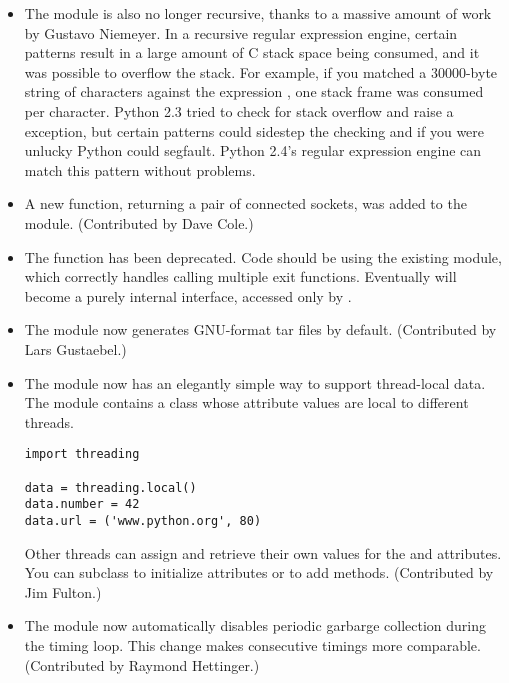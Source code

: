 \documentclass{howto}
\begin{document}
\begin{itemize}
\item The  module is also no longer recursive, thanks to a
massive amount of work by Gustavo Niemeyer.  In a recursive regular
expression engine, certain patterns result in a large amount of C
stack space being consumed, and it was possible to overflow the stack.
For example, if you matched a 30000-byte string of  characters
against the expression , one stack frame was consumed
per character.  Python 2.3 tried to check for stack overflow and raise
a  exception, but certain patterns could
sidestep the checking and if you were unlucky Python could segfault.
Python 2.4's regular expression engine can match this pattern without
problems.

\item A new  function, returning a pair of
connected sockets, was added to the  module.
(Contributed by Dave Cole.)

\item The  function has been deprecated.  Code
should be using the existing  module, which correctly
handles calling multiple exit functions.  Eventually
 will become a purely internal interface,
accessed only by .

\item The  module now generates GNU-format tar files
by default.  (Contributed by Lars Gustaebel.)

\item The  module now has an elegantly simple way to support 
thread-local data.  The module contains a  class whose
attribute values are local to different threads.

\begin{verbatim}
import threading

data = threading.local()
data.number = 42
data.url = ('www.python.org', 80)
\end{verbatim}

Other threads can assign and retrieve their own values for the
 and  attributes.  You can subclass
 to initialize attributes or to add methods.
(Contributed by Jim Fulton.)

\item The  module now automatically disables periodic
  garbarge collection during the timing loop.  This change makes
  consecutive timings more comparable.  (Contributed by Raymond Hettinger.)


\end{itemize}
\end{document}

